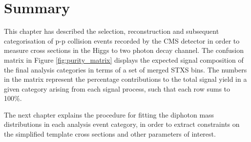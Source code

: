 \section{Summary}

This chapter has described the selection, reconstruction and subsequent categorisation of p-p collision events recorded by the CMS detector in order to measure cross sections in the Higgs to two photon decay channel. The confusion matrix in Figure \ref{fig:purity_matrix} displays the expected signal composition of the final analysis categories in terms of a set of merged STXS bins. The numbers in the matrix represent the percentage contributions to the total signal yield in a given category arising from each signal process, such that each row sums to 100\%.

The next chapter explains the procedure for fitting the diphoton mass distributions in each analysis event category, in order to extract constraints on the simplified template cross sections and other parameters of interest.

